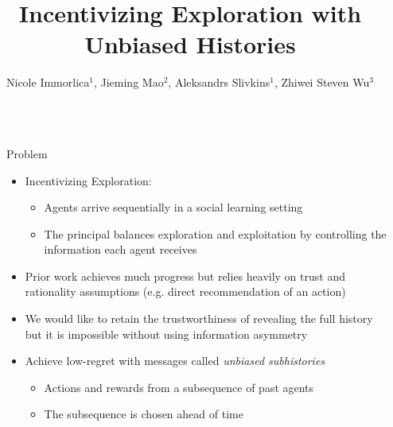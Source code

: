 \documentclass[final]{beamer}
\title{Incentivizing Exploration with Unbiased Histories} %
\author{Nicole Immorlica$^1$, Jieming Mao$^2$, Aleksandrs Slivkins$^1$, Zhiwei Steven Wu$^3$} %
\institute{Microsoft Research$^1$, University of Pennsylvania$^2$, University of Minnesota$^3$} %
\begin{document}

\setlength{\belowcaptionskip}{2ex} %
\setlength\belowdisplayshortskip{2ex} %

\begin{frame}[t]

\begin{columns}[t]

\begin{column}{.01\textwidth}\end{column} %

\begin{column}{.44\textwidth} %

\begin{alertblock}{Problem}
\begin{itemize}
\item Incentivizing Exploration: 
\begin{itemize}
\item Agents arrive sequentially in a social learning setting 
\item The principal balances exploration and exploitation by controlling the information each agent receives
\end{itemize}
\item Prior work achieves much progress but relies heavily on trust and rationality assumptions (e.g. direct recommendation of an action)
\item We would like to retain the trustworthiness of revealing the full history but it is impossible without using information asymmetry 
\item Achieve low-regret with messages called \emph{unbiased subhistories} 
\begin{itemize}
\item Actions and rewards from a subsequence of past agents 
\item The subsequence is chosen ahead of time
\end{itemize}
\end{itemize}
\end{alertblock}


\end{column}
\end{columns}
\end{frame}
\end{document}
